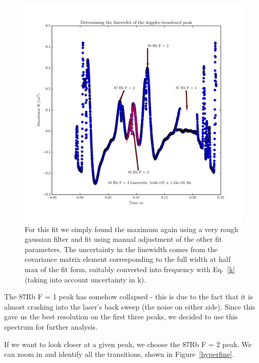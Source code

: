 \documentclass{article}
\begin{document}
  \begin{figure}
    \centering
    \includegraphics[scale=.75]{../plots/rb85_fwhm.pdf}
    \caption{For this fit we simply found the maximum again using a very rough gaussian filter and fit using manual adjustment of the other fit parameters.  The uncertainty in the linewidth comes from the covariance matrix element corresponding to the full width at half max of the fit form, suitably converted into frequency with Eq.~\ref{k} (taking into account uncertainty in k).}
  \end{figure}

  \hspace{.25cm}

  The 87Rb F = 1 peak has somehow collapsed - this is due to the fact that it is almost crashing into the laser's back sweep (the noise on either side).  Since this gave us the best resolution on the first three peaks, we decided to use this spectrum for further analysis.

  \hspace{.25cm}

  If we want to look closer at a given peak, we choose the 87Rb F = 2 peak.  We can zoom in and identify all the transitions, shown in Figure~\ref{hyperfine}.

  \hspace{.25cm}
\end{document}
